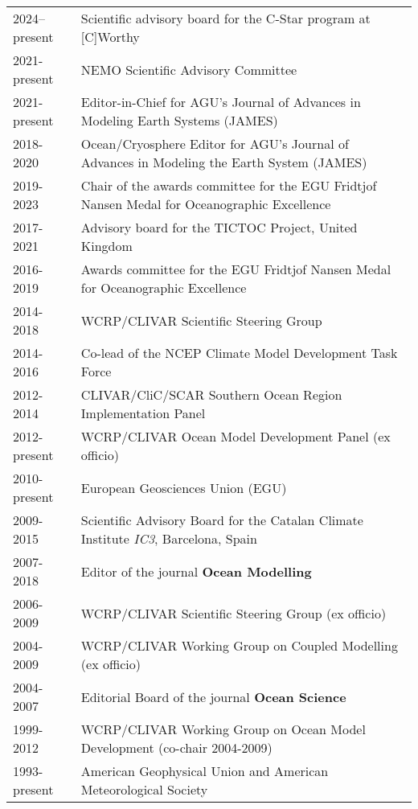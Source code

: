 \documentclass{article}
\begin{document}
\begin{tabular}{ll}
    2024--present & Scientific advisory board for the C-Star program at [C]Worthy
  \\
2021-present & NEMO Scientific Advisory Committee
\\

2021-present & Editor-in-Chief for  AGU's  Journal of Advances in Modeling Earth Systems (JAMES) 
 \\
2018-2020 & Ocean/Cryosphere Editor for AGU's  
Journal of Advances in Modeling the Earth System (JAMES) 
\\
2019-2023 & Chair of the awards committee for the EGU Fridtjof Nansen Medal for Oceanographic Excellence
\\
2017-2021 & Advisory board for the TICTOC Project, United Kingdom
\\
  2016-2019 & Awards committee for the EGU Fridtjof Nansen Medal for Oceanographic Excellence 
  \\
2014-2018 &  WCRP/CLIVAR Scientific Steering Group 
\\
2014-2016     & Co-lead of the NCEP Climate Model Development Task Force
\\
2012-2014     & CLIVAR/CliC/SCAR Southern Ocean Region Implementation Panel 
\\
2012-present &  WCRP/CLIVAR Ocean Model Development Panel (ex officio)
\\
2010-present & European Geosciences Union (EGU)
\\
2009-2015  &  Scientific Advisory Board for the Catalan  Climate Institute {\it IC3}, Barcelona, Spain 
\\
2007-2018 & Editor of the journal {\bf Ocean Modelling} 
\\
2006-2009     &  WCRP/CLIVAR Scientific Steering Group (ex officio) 
\\
2004-2009     &  WCRP/CLIVAR Working Group on Coupled Modelling (ex officio) \\

2004-2007     & Editorial Board of the journal {\bf Ocean Science} \\

1999-2012     & WCRP/CLIVAR Working Group on Ocean Model Development  (co-chair 2004-2009) \\

1993-present  & American Geophysical Union and American Meteorological Society \\

\end{tabular}
\end{document}
